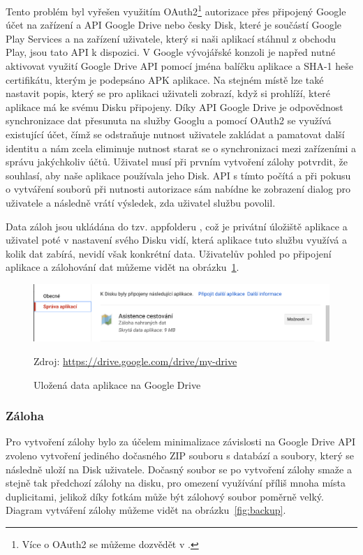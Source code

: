 \documentclass[czech,master,public,dept460,male,java,cpdeclaration]{diploma}
\begin{document}
Tento problém byl vyřešen využitím OAuth2\footnote{Více o OAuth2 se můžeme dozvědět v \cite{oauth2}.}
autorizace přes připojený Google účet na zařízení a API Google Drive nebo česky Disk,
 které je součástí Google Play Services a na zařízení uživatele, který si naši aplikací stáhnul z obchodu Play,
 jsou tato API k dispozici.
V Google vývojářské konzoli je napřed nutné aktivovat využití Google Drive API pomocí jména balíčku aplikace a SHA-1 heše
certifikátu, kterým je podepsáno APK aplikace. Na stejném místě lze také nastavit popis, který se pro aplikaci
uživateli zobrazí, když si prohlíží, které aplikace má ke svému Disku připojeny.
Díky API Google Drive je odpovědnost synchronizace dat přesunuta na služby Googlu a pomocí
OAuth2 se využívá existující účet, čímž se odstraňuje nutnost uživatele zakládat a pamatovat
 další identitu a nám zcela eliminuje nutnost starat se o synchronizaci mezi zařízeními a správu jakýchkoliv účtů.
 Uživatel musí při prvním vytvoření zálohy potvrdit, že souhlasí, aby naše aplikace používala jeho Disk.
 API s tímto počítá a při pokusu o vytváření souborů při nutnosti autorizace sám nabídne ke zobrazení
 dialog pro uživatele a následně vrátí výsledek, zda uživatel službu povolil.

 Data záloh jsou ukládána do tzv. appfolderu \cite{driveappfolder}, což je privátní úložiště aplikace
 a uživatel poté v nastavení svého Disku vidí,
  která aplikace tuto službu využívá a kolik dat zabírá, nevidí však konkrétní data.
  Uživatelův pohled po připojení aplikace a zálohování dat můžeme vidět na obrázku~\ref{fig:connecteddrive}.

\begin{figure}[H]
        \centering
                \includegraphics[scale=0.3]{img/connectedDrive.png}
        \caption{Uložená data aplikace na Google Drive}
        \label{fig:connecteddrive}
        \centering Zdroj: \url{https://drive.google.com/drive/my-drive}
\end{figure}

\subsubsection{Záloha}
Pro vytvoření zálohy bylo za účelem minimalizace závislosti na Google Drive API zvoleno vytvoření jediného
dočasného ZIP souboru s databází a soubory, který se následně uloží na Disk uživatele. Dočasný soubor se po
vytvoření zálohy smaže a stejně tak předchozí zálohy na disku, pro omezení využívání příliš mnoha místa duplicitami,
jelikož díky fotkám může být zálohový soubor poměrně velký. Diagram vytváření zálohy můžeme vidět na obrázku~\ref{fig:backup}.
\end{document}
